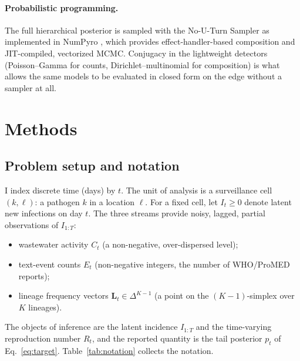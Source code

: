 \documentclass[10pt,twocolumn]{article}
\theoremstyle{definition}
\newcommand{\Rt}{R_t}
\begin{document}
\paragraph{Probabilistic programming.}
The full hierarchical posterior is sampled with the No-U-Turn Sampler
\citep{hoffman2014} as implemented in NumPyro \citep{phan2019,bingham2019}, which
provides effect-handler-based composition and JIT-compiled, vectorized MCMC.
Conjugacy in the lightweight detectors (Poisson--Gamma for counts,
Dirichlet--multinomial for composition) is what allows the same models to be
evaluated in closed form on the edge without a sampler at all.

\section{Methods}

\subsection{Problem setup and notation}
\label{sec:problem}

I index discrete time (days) by $t$. The unit of analysis is a
surveillance cell $(k,\ell)$: a pathogen $k$ in a location $\ell$. For a
fixed cell, let $I_t \ge 0$ denote latent new infections on day $t$. The three
streams provide noisy, lagged, partial observations of $I_{1:T}$:
\begin{itemize}[leftmargin=1.2em,itemsep=1pt,topsep=2pt]
\item wastewater activity $C_t$ (a non-negative, over-dispersed level);
\item text-event counts $E_t$ (non-negative integers, the number of WHO/ProMED
reports);
\item lineage frequency vectors $\mathbf L_t \in \Delta^{K-1}$ (a point on the
$(K{-}1)$-simplex over $K$ lineages).
\end{itemize}
The objects of inference are the latent incidence $I_{1:T}$ and the
time-varying reproduction number $\Rt$, and the reported quantity is the tail
posterior $p_t$ of Eq.~\eqref{eq:target}. Table~\ref{tab:notation} collects the
notation.
\end{document}
